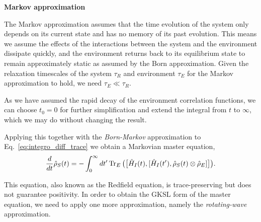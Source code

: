 \textbf{Markov approximation}

The Markov approximation assumes that the time evolution of the system only depends on its current state and has no memory of its past evolution. This means we assume the effects of the interactions between the system and the environment dissipate quickly, and the environment returns back to its equilibrium state to remain approximately static as assumed by the Born approximation. Given the relaxation timescales of the system $\tau_R$ and environment $\tau_E$ for the Markov approximation to hold, we need $\tau_E \ll \tau_R$.

As we have assumed the rapid decay of the environment correlation functions, we can choose $t_0 = 0$ for further simplification and extend the integral from $t$ to $\infty$, which we may do without changing the result.

Applying this together with the \textit{Born-Markov} approximation to Eq.~\ref{eq:integro_diff_trace} we obtain a Markovian master equation, 
\begin{equation}
    \label{eq:born-markov_meq}
\frac{d}{dt} \hat{\rho}_S(t) = - \int_{0}^{\infty} dt' \Tr_E\big(\big[\hat{H}_ I(t), [\hat{H}_I(t'),\hat{\rho}_S(t)\otimes \hat{\rho}_E]\big]\big).
\end{equation}

This equation, also known as the Redfield equation, is trace-preserving but does not guarantee positivity. In order to obtain the GKSL form of the master equation, we need to apply one more approximation, namely the \textit{rotating-wave} approximation. 

